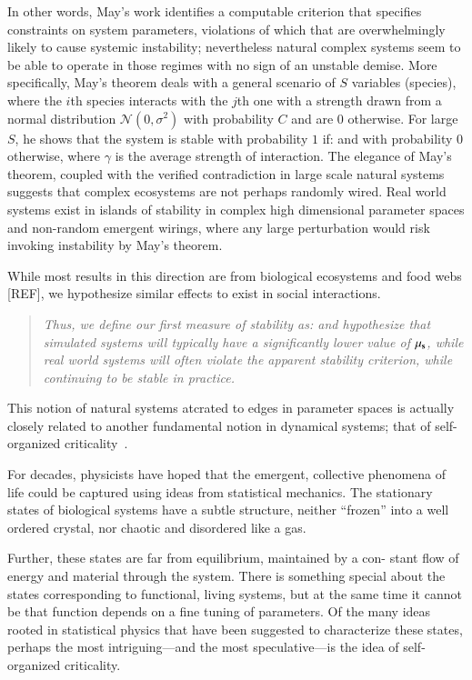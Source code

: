 \documentclass[onecolumn, compsoc,11pt]{IEEEtran}
\begin{document}
In other words, May's work identifies a computable criterion that specifies constraints on system parameters, violations of which  that are overwhelmingly likely to cause systemic instability; nevertheless natural complex systems seem to be able to operate in those regimes with no sign of an unstable demise.
%
More specifically, May's theorem deals with a general scenario of $S$ variables (species), where the $i$th species interacts with the $j$th one with a strength  drawn  from a normal distribution
$\mathcal{N}(0,\sigma^2 )$ with probability $C$ and are $0$ otherwise.
For large $S$, he shows that the system is stable with probability $1$ if:
 and with probability 0 otherwise, where $\gamma$ is the average strength of interaction.
The elegance of May's theorem, coupled with the  verified contradiction in large scale natural systems suggests that  complex ecosystems are  not perhaps randomly wired. Real world  systems exist in islands of stability in complex high dimensional parameter spaces and non-random emergent wirings, where any large perturbation would risk invoking instability by  May's theorem.

While most results in this direction are from biological ecosystems and food webs [REF], we hypothesize similar effects to exist in social interactions.

\begin{quote}\itshape 
Thus, we  define our first measure of stability as:
and hypothesize that simulated systems will typically have a significantly lower value of $\mu_\S$, while real world systems will often violate the apparent stability criterion, while continuing to be stable in practice.
\end{quote}
This notion of natural systems atcrated to edges in parameter spaces is actually closely related to another fundamental notion in dynamical systems; that of self-organized criticality~\cite{mora2011biological}.

For decades, physicists have hoped that the emergent, collective phenomena of life could be captured using ideas from statistical mechanics. The stationary states of biological systems have a subtle structure, neither “frozen” into a well ordered crystal, nor chaotic and disordered like a gas.


Further, these states are far from equilibrium, maintained by a con-
stant flow of energy and material through the system. There is something special about the states corresponding to functional, living systems, but at the same time it cannot be that function depends on a fine tuning of parameters. Of the many ideas rooted in statistical physics that have been suggested to characterize these states, perhaps the most intriguing—and the most speculative—is the idea of self-organized criticality.
\end{document}
